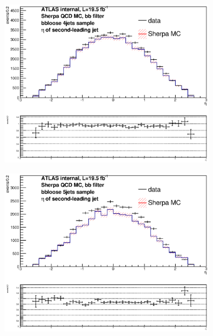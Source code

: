 \begin{figure}[phtb!]
\begin{center}
  \begin{subfigure}[$bbloose$ 4 jet category]{0.3\textwidth}\includegraphics[width=\textwidth]{MonteCarlo/figures/eta1_bbloose_4jets.eps}\end{subfigure}
  \begin{subfigure}[$bbloose$ 5+ jet category]{0.3\textwidth}\includegraphics[width=\textwidth]{MonteCarlo/figures/eta1_bbloose_5jets.eps}\end{subfigure}

\end{center}
\end{figure}
